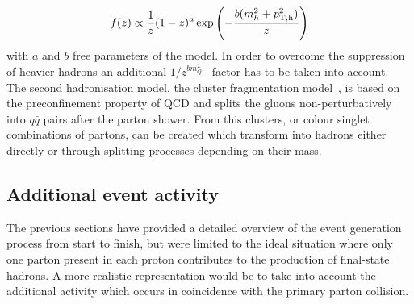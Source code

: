 \begin{equation}
 f(z) \propto \frac{1}{z} (1-z)^{a} \exp \left( - \frac{b(m_{h}^{2} + p_{\rm T,h}^{2})}{z} \right)
\end{equation}
with $a$ and $b$ free parameters of the model.
In order to overcome the suppression of heavier hadrons an additional $1/z^{bm_{Q}^{2}}$~\cite{} factor has to be taken into account.
\\
The second hadronisation model, the cluster fragmentation model~\cite{ClusterModel}, is based on the preconfinement property of QCD and splits the gluons non-perturbatively into $q\bar{q}$ pairs after the parton shower. From this clusters, or colour singlet combinations of partons, can be created which transform into hadrons either directly or through splitting processes depending on their mass. 

\subsection{Additional event activity}%

The previous sections have provided a detailed overview of the event generation process from start to finish, but were limited to the ideal situation where only one parton present in each proton contributes to the production of final-state hadrons. A more realistic representation would be to take into account the additional activity which occurs in coincidence with the primary parton collision. 
\\

